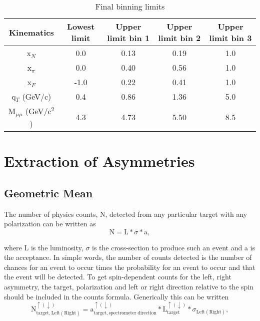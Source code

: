 \begin{table}[h!]
  \centering
  \begin{tabular}{ |c|c|c|c|c| }
    \hline \textbf{Kinematics}& \textbf{Lowest limit}& \textbf{Upper limit bin
      1}& \textbf{Upper limit bin 2}& \textbf{Upper limit bin 3}\\ \hline
    
    x$_N$& 0.0& 0.13& 0.19& 1.0\\ \hline x$_{\pi}$& 0.0& 0.40& 0.56&
    1.0\\ \hline x$_F$& -1.0& 0.22& 0.41& 1.0\\ \hline q$_T$ (GeV/c)& 0.4& 0.86&
    1.36& 5.0\\ \hline M$_{\mu\mu}$ (GeV/c$^2$)& 4.3& 4.73& 5.50& 8.5 \\ \hline
    
  \end{tabular}
  \caption{Final binning limits}
  \label{tab::binning}
\end{table}


\section{Extraction of Asymmetries} 

\subsection{Geometric Mean}
The number of physics counts, N, detected from any particular target with any
polarization can be written as
\begin{equation}
\mathrm{N} = \mathrm{L} * \sigma * \mathrm{a},
\end{equation}

\noindent
where L is the luminosity, $\sigma$ is the cross-section to produce such an
event and a is the acceptance.  In simple words, the number of counts detected
is the number of chances for an event to occur times the probability for an
event to occur and that the event will be detected.  To get spin-dependent
counts for the left, right asymmetry, the target, polarization and left or right
direction relative to the spin should be included in the counts formula.
Generically this can be written
\begin{equation}
  \label{eqn::indexedCount}
\mathrm{N}^{\uparrow(\downarrow)}_{\mathrm{target},\mathrm{Left(Right)}} =
\mathrm{a}^{\uparrow(\downarrow)}_{\mathrm{target},\mathrm{spectrometer \;
    direction}} * \mathrm{L}^{\uparrow(\downarrow)}_{\mathrm{target}} *
\sigma_{\mathrm{Left(Right)}},
\end{equation}

